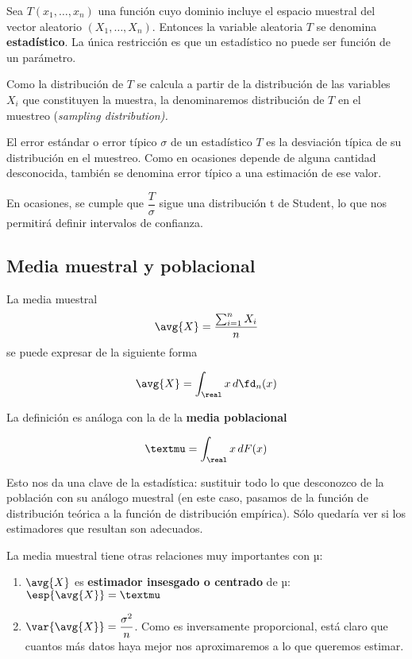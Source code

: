 \documentclass{apuntes}
\begin{document}
\begin{defn}[Estadístico]
Sea $T(x_1,\dotsc,x_n)$ una función cuyo dominio incluye el espacio muestral del vector aleatorio $(X_1, \dotsc, X_n)$. Entonces la variable aleatoria $T$ se denomina \textbf{estadístico}. La única restricción es que un estadístico no puede ser función de un parámetro.
\end{defn}

Como la distribución de $T$ se calcula a partir de la distribución de las variables $X_i$ que constituyen la muestra, la denominaremos distribución de $T$ en el muestreo (\textit{sampling distribution).}

\begin{defn}
El error estándar o error típico $\sigma$ de un estadístico $T$ es la desviación típica de su distribución en el muestreo. Como en ocasiones depende de alguna cantidad desconocida, también se denomina error típico a una estimación de ese valor.
\end{defn}

En ocasiones, se cumple que $\dfrac{T}{\sigma}$ sigue una distribución t de Student, lo que nos permitirá definir intervalos de confianza.

\subsection{Media muestral y poblacional}

\begin{defn} La media muestral \[ \avg{X} = \frac{\sum_{i=1}^n X_i}{n} \] se puede expresar de la siguiente forma

\[ \avg{X} = \int_\real x\,d\fd_n(x) \]
\end{defn}

La definición es análoga con la de la \textbf{media poblacional}

\[ µ = \int_\real x \,dF(x) \]

Esto nos da una clave de la estadística: sustituir todo lo que desconozco de la población con su análogo muestral (en este caso, pasamos de la función de distribución teórica a la función de distribución empírica). Sólo quedaría ver si los estimadores que resultan son adecuados.

La media muestral tiene otras relaciones muy importantes con $µ$:

\begin{enumerate}
\item $\avg{X}$ es  \textbf{estimador insesgado o centrado} de µ: $ \esp{\avg{X}} = µ$
\item $\var{\avg{X}} = \dfrac{\sigma^2}{n}$. Como es inversamente proporcional, está claro que cuantos más datos haya mejor nos aproximaremos a lo que queremos estimar.
\end{enumerate}
\end{document}
